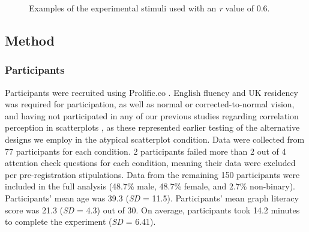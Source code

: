 \documentclass[manuscript,screen,review]{acmart}
\begin{document}
\begin{figure}


\caption{\label{fig-example-plots}Examples of the experimental stimuli
used with an \textit{r} value of 0.6.}

\end{figure}%

\subsection{Method}\label{method}

\subsubsection{Participants}\label{participants}

Participants were recruited using Prolific.co \citep{prolific}. English
fluency and UK residency was required for participation, as well as
normal or corrected-to-normal vision, and having not participated in any
of our previous studies regarding correlation perception in scatterplots
\citep{strain}, as these represented earlier testing of the alternative
designs we employ in the atypical scatterplot condition. Data were
collected from 77 participants for each condition. 2 participants failed
more than 2 out of 4 attention check questions for each condition,
meaning their data were excluded per pre-registration stipulations. Data
from the remaining 150 participants were included in the full analysis
(48.7\% male, 48.7\% female, and 2.7\% non-binary). Participants' mean
age was 39.3 (\emph{SD} = 11.5). Participants' mean graph literacy score
was 21.3 (\emph{SD} = 4.3) out of 30. On average, participants took 14.2
minutes to complete the experiment (\emph{SD} = 6.41).
\end{document}
